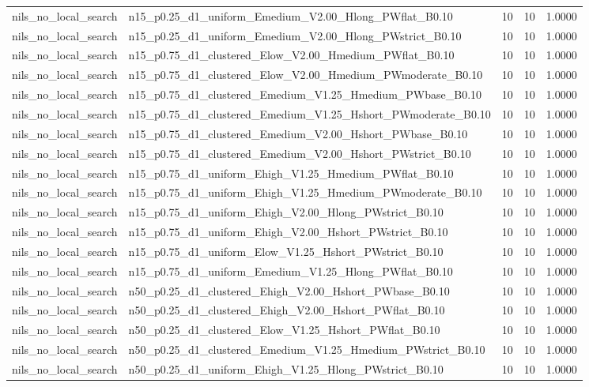 \begin{tabular}{llrrr}
nils_no_local_search & n15_p0.25_d1_uniform_Emedium_V2.00_Hlong_PWflat_B0.10 & 10 & 10 & 1.0000 \\
nils_no_local_search & n15_p0.25_d1_uniform_Emedium_V2.00_Hlong_PWstrict_B0.10 & 10 & 10 & 1.0000 \\
nils_no_local_search & n15_p0.75_d1_clustered_Elow_V2.00_Hmedium_PWflat_B0.10 & 10 & 10 & 1.0000 \\
nils_no_local_search & n15_p0.75_d1_clustered_Elow_V2.00_Hmedium_PWmoderate_B0.10 & 10 & 10 & 1.0000 \\
nils_no_local_search & n15_p0.75_d1_clustered_Emedium_V1.25_Hmedium_PWbase_B0.10 & 10 & 10 & 1.0000 \\
nils_no_local_search & n15_p0.75_d1_clustered_Emedium_V1.25_Hshort_PWmoderate_B0.10 & 10 & 10 & 1.0000 \\
nils_no_local_search & n15_p0.75_d1_clustered_Emedium_V2.00_Hshort_PWbase_B0.10 & 10 & 10 & 1.0000 \\
nils_no_local_search & n15_p0.75_d1_clustered_Emedium_V2.00_Hshort_PWstrict_B0.10 & 10 & 10 & 1.0000 \\
nils_no_local_search & n15_p0.75_d1_uniform_Ehigh_V1.25_Hmedium_PWflat_B0.10 & 10 & 10 & 1.0000 \\
nils_no_local_search & n15_p0.75_d1_uniform_Ehigh_V1.25_Hmedium_PWmoderate_B0.10 & 10 & 10 & 1.0000 \\
nils_no_local_search & n15_p0.75_d1_uniform_Ehigh_V2.00_Hlong_PWstrict_B0.10 & 10 & 10 & 1.0000 \\
nils_no_local_search & n15_p0.75_d1_uniform_Ehigh_V2.00_Hshort_PWstrict_B0.10 & 10 & 10 & 1.0000 \\
nils_no_local_search & n15_p0.75_d1_uniform_Elow_V1.25_Hshort_PWstrict_B0.10 & 10 & 10 & 1.0000 \\
nils_no_local_search & n15_p0.75_d1_uniform_Emedium_V1.25_Hlong_PWflat_B0.10 & 10 & 10 & 1.0000 \\
nils_no_local_search & n50_p0.25_d1_clustered_Ehigh_V2.00_Hshort_PWbase_B0.10 & 10 & 10 & 1.0000 \\
nils_no_local_search & n50_p0.25_d1_clustered_Ehigh_V2.00_Hshort_PWflat_B0.10 & 10 & 10 & 1.0000 \\
nils_no_local_search & n50_p0.25_d1_clustered_Elow_V1.25_Hshort_PWflat_B0.10 & 10 & 10 & 1.0000 \\
nils_no_local_search & n50_p0.25_d1_clustered_Emedium_V1.25_Hmedium_PWstrict_B0.10 & 10 & 10 & 1.0000 \\
nils_no_local_search & n50_p0.25_d1_uniform_Ehigh_V1.25_Hlong_PWstrict_B0.10 & 10 & 10 & 1.0000 \\

\end{tabular}
